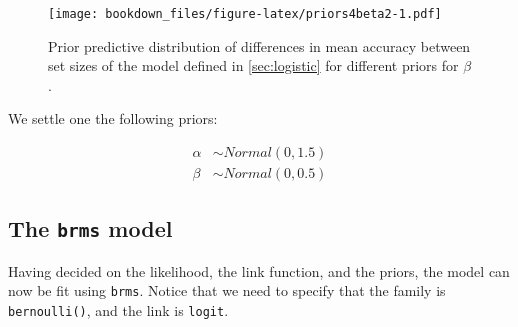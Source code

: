 \documentclass[12pt,]{krantz}
\theoremstyle{definition}
\theoremstyle{definition}
\theoremstyle{definition}
\theoremstyle{remark}
\begin{document}
\begin{figure}
\centering
\texttt{[image: bookdown\_files/figure-latex/priors4beta2-1.pdf]}
\caption{\label{fig:priors4beta2}Prior predictive distribution of differences in mean accuracy between set sizes of the model defined in \ref{sec:logistic} for different priors for \(\beta\).}
\end{figure}

We settle one the following priors:

\begin{equation}
\begin{aligned}
\alpha &\sim Normal(0, 1.5) \\
\beta &\sim Normal(0, 0.5) 
\end{aligned}
\end{equation}

\hypertarget{the-brms-model-2}{%
\subsection{\texorpdfstring{The \texttt{brms} model}{The brms model}}\label{the-brms-model-2}}

Having decided on the likelihood, the link function, and the priors, the model can now be fit using \texttt{brms}. Notice that we need to specify that the family is \texttt{bernoulli()}, and the link is \texttt{logit}.
\end{document}

